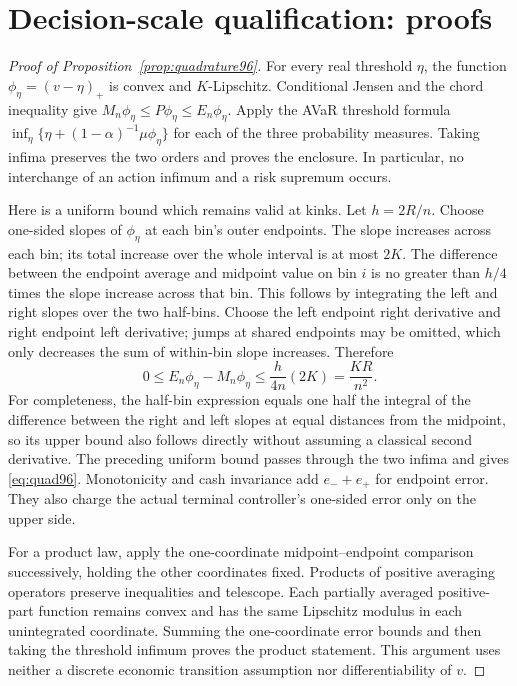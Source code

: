 \section{Decision-scale qualification: proofs}\label{sec:proofs96}
\begin{proof}[Proof of Proposition~\ref{prop:quadrature96}]
For every real threshold $\eta$, the function $\phi_\eta=(v-\eta)_+$ is convex and $K$-Lipschitz. Conditional Jensen and the chord inequality give
$M_n\phi_\eta\leq P\phi_\eta\leq E_n\phi_\eta$.
Apply the AVaR threshold formula
$\inf_\eta\{\eta+(1-\alpha)^{-1}\mu\phi_\eta\}$
for each of the three probability measures. Taking infima preserves the two orders and proves the enclosure. In particular, no interchange of an action infimum and a risk supremum occurs.

Here is a uniform bound which remains valid at kinks. Let $h=2R/n$. Choose one-sided slopes of $\phi_\eta$ at each bin's outer endpoints. The slope increases across each bin; its total increase over the whole interval is at most $2K$. The difference between the endpoint average and midpoint value on bin $i$ is no greater than $h/4$ times the slope increase across that bin. This follows by integrating the left and right slopes over the two half-bins. Choose the left endpoint right derivative and right endpoint left derivative; jumps at shared endpoints may be omitted, which only decreases the sum of within-bin slope increases. Therefore
\[
 0\leq E_n\phi_\eta-M_n\phi_\eta
       \leq\frac{h}{4n}(2K)=\frac{KR}{n^2}.
\]
For completeness, the half-bin expression equals one half the integral of the difference between the right and left slopes at equal distances from the midpoint, so its upper bound also follows directly without assuming a classical second derivative. The preceding uniform bound passes through the two infima and gives \eqref{eq:quad96}. Monotonicity and cash invariance add $e_-+e_+$ for endpoint error. They also charge the actual terminal controller's one-sided error only on the upper side.

For a product law, apply the one-coordinate midpoint--endpoint comparison successively, holding the other coordinates fixed. Products of positive averaging operators preserve inequalities and telescope. Each partially averaged positive-part function remains convex and has the same Lipschitz modulus in each unintegrated coordinate. Summing the one-coordinate error bounds and then taking the threshold infimum proves the product statement. This argument uses neither a discrete economic transition assumption nor differentiability of $v$.
\end{proof}


